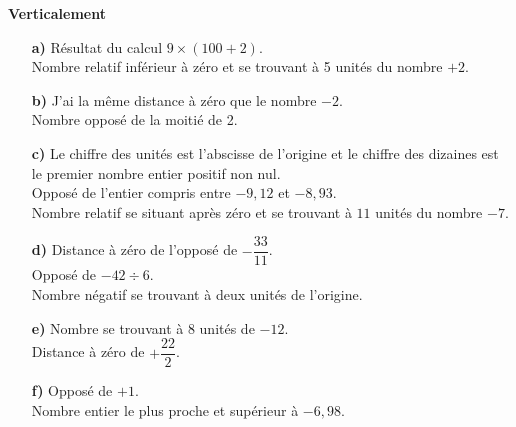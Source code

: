 \begin{enigme}
\begin{multicols}{2}
    {\bf Verticalement} \\
    \begin{enumerate}
       \item[\textcolor{B1}{\bf a)}] Résultat du calcul $9\times(100+2)$. \\
          Nombre relatif inférieur à zéro et se trouvant à 5 unités du nombre $+2$. \\
       \item[\textcolor{B1}{\bf b)}] J'ai la même distance à zéro que le nombre $-2$. \\
          Nombre opposé de la moitié de 2. \\
       \item[\textcolor{B1}{\bf c)}] Le chiffre des unités est l'abscisse de l'origine et le chiffre des dizaines est le premier nombre entier positif non nul. \\
          Opposé de l'entier compris entre $-9,12$ et $-8,93$. \\
          Nombre relatif se situant après zéro et se trouvant à $11$ unités du nombre $-7$. \\
       \item[\textcolor{B1}{\bf d)}] Distance à zéro de l'opposé de $-\dfrac{33}{11}$. \\ [1mm]
          Opposé de $-42\div6$. \\
          Nombre négatif se trouvant à deux unités de l'origine. \\
       \item[\textcolor{B1}{\bf e)}] Nombre se trouvant à 8 unités de $-12$. \\ [1mm]
          Distance à zéro de $+\dfrac{22}{2}$. \\
       \item[\textcolor{B1}{\bf f)}] Opposé de $+1$. \\
          Nombre entier le plus proche et supérieur à $-6,98$.
    \end{enumerate}
 \end{multicols}
 \end{enigme}
 

